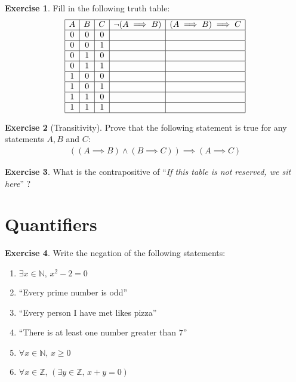 \documentclass[a4paper,oneside]{article}
\theoremstyle{definition} \newtheorem{exercise}{Exercise}[section]
\begin{document}
\begin{exercise}
  Fill in the following truth table:
  \begin{align*}
    \begin{array}{|c|c|c|c|c|}
      \hline
      A & B & C & \neg(A\implies B) & (A\implies B) \implies C \\
      \hline
      0 & 0 & 0 & & \\
      \hline
      0 & 0 & 1 & & \\
      \hline
      0 & 1 & 0 & & \\
      \hline
      0 & 1 & 1 & & \\
      \hline
      1 & 0 & 0 & & \\
      \hline
      1 & 0 & 1 & & \\
      \hline
      1 & 1 & 0 & & \\
      \hline
      1 & 1 & 1 & & \\
      \hline
    \end{array}
  \end{align*}
\end{exercise}

\begin{exercise}[Transitivity]
  Prove that the following statement is true for any statements $A,B$ and $C$:
  \begin{align*}
    ((A\implies B)\land (B\implies C))\implies (A\implies C)
  \end{align*}
\end{exercise}

\begin{exercise}
What is the contrapositive of ``\emph{If this table is not reserved, we sit
here}'' ?
\end{exercise}

\section{Quantifiers}

\begin{exercise}
  Write the negation of the following statements:
  \begin{enumerate}
    \item $\exists x\in \mathbb N,\, x^2-2=0$
    \item ``Every prime number is odd''
    \item ``Every person I have met likes pizza''
    \item ``There is at least one number greater than $7$''
    \item $\forall x\in \mathbb N,\,x\geq 0$
    \item $\forall x\in \mathbb Z,\,(\exists y\in\mathbb Z,\,x+y=0)$
  \end{enumerate}
\end{exercise}
\end{document}
